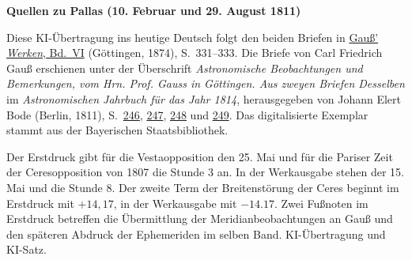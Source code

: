 \clearpage\thispagestyle{empty}
\begin{center}\textbf{Quellen zu Pallas (10. Februar und 29. August 1811)}\end{center}
\noindent Diese KI-Übertragung ins heutige Deutsch folgt den beiden Briefen in \href{https://gdz.sub.uni-goettingen.de/id/PPN236007467}{Gauß’ \textit{Werken}, Bd.~VI} (Göttingen, 1874), S.~331--333. Die Briefe von Carl Friedrich Gauß erschienen unter der Überschrift \textit{Astronomische Beobachtungen und Bemerkungen, vom Hrn. Prof. Gauss in Göttingen. Aus zweyen Briefen Desselben} im \textit{Astronomischen Jahrbuch für das Jahr 1814}, herausgegeben von Johann Elert Bode (Berlin, 1811), S.~\href{https://api.digitale-sammlungen.de/iiif/image/v2/bsb10538343_00254/full/1600,/0/default.jpg}{246}, \href{https://api.digitale-sammlungen.de/iiif/image/v2/bsb10538343_00255/full/1600,/0/default.jpg}{247}, \href{https://api.digitale-sammlungen.de/iiif/image/v2/bsb10538343_00256/full/1600,/0/default.jpg}{248} und \href{https://api.digitale-sammlungen.de/iiif/image/v2/bsb10538343_00257/full/1600,/0/default.jpg}{249}. Das digitalisierte Exemplar stammt aus der Bayerischen Staatsbibliothek.
\par\smallskip\noindent Der Erstdruck gibt für die Vestaopposition den 25. Mai und für die Pariser Zeit der Ceresopposition von 1807 die Stunde 3 an. In der Werkausgabe stehen der 15. Mai und die Stunde 8. Der zweite Term der Breitenstörung der Ceres beginnt im Erstdruck mit $+14{,}17$, in der Werkausgabe mit $-14.17$. Zwei Fußnoten im Erstdruck betreffen die Übermittlung der Meridianbeobachtungen an Gauß und den späteren Abdruck der Ephemeriden im selben Band. KI-Übertragung und KI-Satz.
\clearpage
